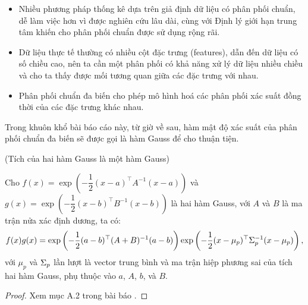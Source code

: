 \begin{itemize}
    \item Nhiều phương pháp thống kê dựa trên giả định dữ liệu có phân phối chuẩn, dễ làm việc hơn vì được nghiên cứu lâu dài, cùng với Định lý giới hạn trung tâm khiến cho phân phối chuẩn được sử dụng rộng rãi.
    \item Dữ liệu thực tế thường có nhiều cột đặc trưng (features), dẫn đến dữ liệu có số chiều cao, nên ta cần một phân phối có khả năng xử lý dữ liệu nhiều chiều và cho ta thấy được mối tương quan giữa các đặc trưng với nhau.
    \item Phân phối chuẩn đa biến cho phép mô hình hoá các phân phối xác suất đồng thời của các đặc trưng khác nhau.
\end{itemize}

Trong khuôn khổ bài báo cáo này, từ giờ về sau, hàm mật độ xác suất của phân phối chuẩn đa biến sẽ được gọi là hàm Gauss để cho thuận tiện.

\begin{lemma}\label{lem:prod_gauss} (Tích của hai hàm Gauss là một hàm Gauss)

    Cho $f(x) = \exp\left(-\dfrac{1}{2}(x - a)^{\top} A^{-1} (x - a)\right)$ 
    và $g(x) = \exp\left( -\dfrac{1}{2} (x - b)^{\top} B^{-1} (x - b)\right)$ là hai hàm Gauss, với $A$ và $B$ là ma trận nửa xác định dương, ta có:
    \[
        f(x)g(x)=\exp\left(-\frac{1}{2}(a-b)^{\top}(A+B)^{-1}(a-b)\right)
        \exp\left(-\frac{1}{2}(x-\mu_{p})^{\top}\Sigma_{p}^{-1}(x-\mu_{p})\right),
    \]
    với $\mu_p$ và $\Sigma_p$ 
    lần lượt là vector trung bình và ma trận hiệp phương sai của tích hai hàm Gauss, 
    phụ thuộc vào $a$, $A$, $b$, và $B$.
\end{lemma}

\begin{proof}
    Xem mục A.2 trong bài báo \cite{le2020neumiss}.
\end{proof}

